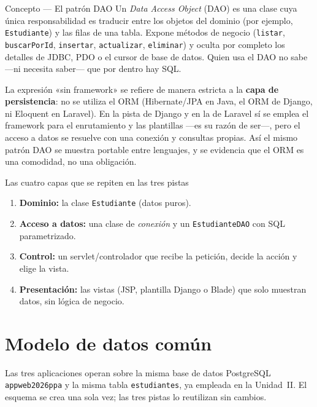 \begin{cajadefinicion}{Concepto --- El patrón DAO}
Un \emph{Data Access Object} (DAO) es una clase cuya única
responsabilidad es traducir entre los objetos del dominio (por ejemplo,
\texttt{Estudiante}) y las filas de una tabla. Expone métodos de
negocio (\texttt{listar}, \texttt{buscarPorId}, \texttt{insertar},
\texttt{actualizar}, \texttt{eliminar}) y oculta por completo los
detalles de JDBC, PDO o el cursor de base de datos. Quien usa el DAO no
sabe ---ni necesita saber--- que por dentro hay SQL.
\end{cajadefinicion}

La expresión «sin framework» se refiere de manera estricta a la
\textbf{capa de persistencia}: no se utiliza el ORM (Hibernate/JPA en
Java, el ORM de Django, ni Eloquent en Laravel). En la pista de Django
y en la de Laravel sí se emplea el framework para el enrutamiento y las
plantillas ---es su razón de ser---, pero el acceso a datos se resuelve
con una conexión y consultas propias. Así el mismo patrón DAO se
muestra portable entre lenguajes, y se evidencia que el ORM es una
comodidad, no una obligación.

\begin{cajabuenas}{Las cuatro capas que se repiten en las tres pistas}
\begin{enumerate}
\item \textbf{Dominio:} la clase \texttt{Estudiante} (datos puros).
\item \textbf{Acceso a datos:} una clase de \emph{conexión} y un
\texttt{EstudianteDAO} con SQL parametrizado.
\item \textbf{Control:} un servlet/controlador que recibe la petición,
decide la acción y elige la vista.
\item \textbf{Presentación:} las vistas (JSP, plantilla Django o Blade)
que solo muestran datos, sin lógica de negocio.
\end{enumerate}
\end{cajabuenas}

\section{Modelo de datos común}
\label{ap:crud:modelo}

Las tres aplicaciones operan sobre la misma base de datos PostgreSQL
\texttt{appweb2026ppa} y la misma tabla \texttt{estudiantes}, ya
empleada en la Unidad~II. El esquema se crea una sola vez; las tres
pistas lo reutilizan sin cambios.

